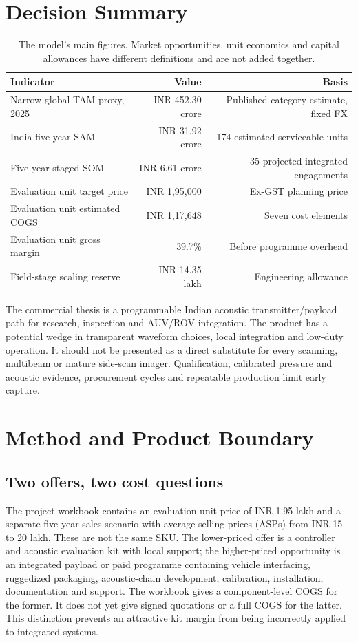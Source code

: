 \documentclass[11pt,a4paper]{article}
\begin{document}
\section{Decision Summary}
\begin{table}[htbp]\centering
\begin{tabularx}{\textwidth}{@{}Yrr@{}}
\toprule
Indicator & Value & Basis\\ \midrule
Narrow global TAM proxy, 2025 & INR 452.30 crore & Published category estimate, fixed FX\\
India five-year SAM & INR 31.92 crore & 174 estimated serviceable units\\
Five-year staged SOM & INR 6.61 crore & 35 projected integrated engagements\\
Evaluation unit target price & INR 1,95,000 & Ex-GST planning price\\
Evaluation unit estimated COGS & INR 1,17,648 & Seven cost elements\\
Evaluation unit gross margin & 39.7\% & Before programme overhead\\
Field-stage scaling reserve & INR 14.35 lakh & Engineering allowance\\ \bottomrule
\end{tabularx}
\caption{The model's main figures. Market opportunities, unit economics and capital allowances have different definitions and are not added together.}
\label{tab:dashboard}
\end{table}

The commercial thesis is a programmable Indian acoustic transmitter/payload path for research, inspection and AUV/ROV integration. The product has a potential wedge in transparent waveform choices, local integration and low-duty operation. It should not be presented as a direct substitute for every scanning, multibeam or mature side-scan imager. Qualification, calibrated pressure and acoustic evidence, procurement cycles and repeatable production limit early capture.

\section{Method and Product Boundary}
\subsection{Two offers, two cost questions}
The project workbook contains an evaluation-unit price of INR 1.95 lakh and a separate five-year sales scenario with average selling prices (ASPs) from INR 15 to 20 lakh. These are not the same SKU. The lower-priced offer is a controller and acoustic evaluation kit with local support; the higher-priced opportunity is an integrated payload or paid programme containing vehicle interfacing, ruggedized packaging, acoustic-chain development, calibration, installation, documentation and support. The workbook gives a component-level COGS for the former. It does not yet give signed quotations or a full COGS for the latter. This distinction prevents an attractive kit margin from being incorrectly applied to integrated systems.
\end{document}
